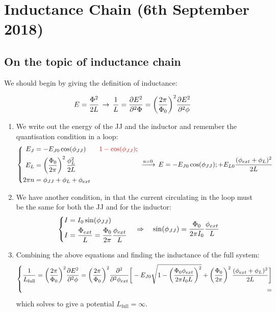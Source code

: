 \section{Inductance Chain (6th September 2018)}
 \subsection{On the topic of inductance chain}
  
  We should begin by giving the definition of inductance:
  
  \[
  	E = \frac{\Phi^2}{2L} \,\rightarrow\, \frac{1}{L} =  \frac{\partial E^2}{\partial^2\Phi} = \bigg(\frac{2\pi}{\Phi_0}\bigg)^2 \frac{\partial E^2}{\partial^2\phi} 
  \]
  
 
  \begin{enumerate}
  	\item We write out the energy of the JJ and the inductor and remember the quantisation condition in a loop:
  	\[
  		\left\lbrace\begin{aligned}
  			E_J & = - E_{J0}\cos(\phi_{JJ}) \qquad{\color{red}{1-\cos(\phi_{JJ})}};\\
  			E_L & = \left(\frac{\Phi_0}{2\pi}\right)^2\frac{\phi_L^2}{2L}\\
  			2\pi n & = \phi_{JJ} + \phi_{L} + \phi_{ext}
  		\end{aligned}\right. \,\xrightarrow{\text{n=0}}\,
  		E = -E_{J0}\cos(\phi_{JJ}); + E_{L0}\frac{(\phi_{ext} + \phi_{L} )^2}{2L}
  	\]
  	\item We have another condition, in that the current circulating in the loop must be the same for both the JJ and for the inductor:
  	\[
  		\left\lbrace\begin{aligned}
  			I & = I_0\sin(\phi_{JJ})\\
  			I & = \frac{\Phi_{ext}}{L} = \frac{\Phi_0}{2\pi}\frac{\phi_{ext}}{L}
  		\end{aligned}\right. \quad\Rightarrow\quad
  		\sin(\phi_{JJ}) = \frac{\Phi_0}{2\pi I_0}\frac{\phi_{ext}}{L}
  	\]
  	\item Combining the above equations and finding the inductance of the full system:
  	\begin{equation}\label{eqn:6sep_1}
  		\left\lbrace\begin{aligned}\frac{1}{L_{\text{full}}} = \bigg(\frac{2\pi}{\Phi_0}\bigg)^2 \frac{\partial E^2}{\partial^2\phi}  = \bigg(\frac{2\pi}{\Phi_0}\bigg)^2 \frac{\partial^2}{\partial^2\phi_{ext}}\bigg[-E_{J0}\sqrt{1-\bigg(\frac{\Phi_0\phi_{ext}}{2\pi I_0 L}\bigg)^2} + \left(\frac{\Phi_0}{2\pi}\right)^2\frac{(\phi_{ext} + \phi_{L} )^2}{2L}\bigg]\\
  		 = 
  		\end{aligned}\right.
  	\end{equation}
  	\noindent which solves to give a potential $ L_{\text{full}} = \infty $.
  \end{enumerate}

